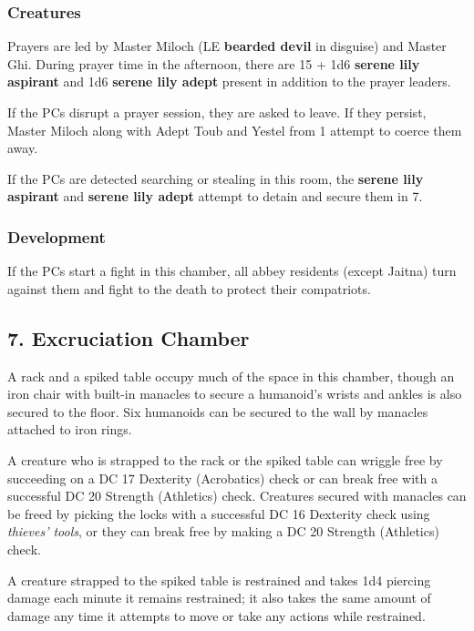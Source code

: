 \documentclass[10pt,a4paper,twoside,bg=print,twocolumn,openany,nodeprecatedcode]{dndbook}
\begin{document}
\subsubsection{Creatures}
Prayers are led by Master Miloch (LE \textbf{bearded devil} in disguise) and Master Ghi. During prayer time in the afternoon, there are 15 + 1d6 \textbf{serene lily aspirant} and 1d6 \textbf{serene lily adept} present in addition to the prayer leaders.

If the PCs disrupt a prayer session, they are asked to leave. If they persist, Master Miloch along with Adept Toub and Yestel from 1 attempt to coerce them away.

If the PCs are detected searching or stealing in this room, the \textbf{serene lily aspirant} and \textbf{serene lily adept} attempt to detain and secure them in 7.

\subsubsection{Development}
If the PCs start a fight in this chamber, all abbey residents (except Jaitna) turn against them and fight to the death to protect their compatriots.

\subsection{7. Excruciation Chamber}
\begin{DndReadAloud}{}
A rack and a spiked table occupy much of the space in this chamber, though an iron chair with built-in manacles to secure a humanoid's wrists and ankles is also secured to the floor. Six humanoids can be secured to the wall by manacles attached to iron rings.

\end{DndReadAloud}

A creature who is strapped to the rack or the spiked table can wriggle free by succeeding on a DC 17 Dexterity (Acrobatics) check or can break free with a successful DC 20 Strength (Athletics) check. Creatures secured with manacles can be freed by picking the locks with a successful DC 16 Dexterity check using \textit{thieves' tools}, or they can break free by making a DC 20 Strength (Athletics) check.

A creature strapped to the spiked table is restrained and takes 1d4 piercing damage each minute it remains restrained; it also takes the same amount of damage any time it attempts to move or take any actions while restrained.
\end{document}
